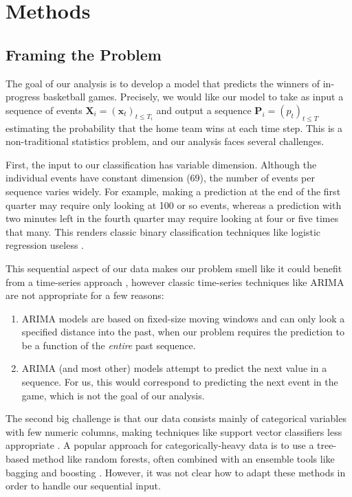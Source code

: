 \section{Methods}
\label{sec:methods}

\subsection{Framing the Problem}

The goal of our analysis is to develop a model that predicts the winners of in-progress basketball games. Precisely, we would like our model to take as input a sequence of events $\mathbf X_i = (\mathbf x_t)_{t \leq T_i}$ and output a sequence $\mathbf P_i = (p_t)_{t \leq T}$ estimating the probability that the home team wins at each time step. This is a non-traditional statistics problem, and our analysis faces several challenges.

First, the input to our classification has variable dimension. Although the individual events have constant dimension (69), the number of events per sequence varies widely. For example, making a prediction at the end of the first quarter may require only looking at 100 or so events, whereas a prediction with two minutes left in the fourth quarter may require looking at four or five times that many. This renders classic binary classification techniques like logistic regression useless \cite[\S 4.4]{ESL}.

This sequential aspect of our data makes our problem smell like it could benefit from a time-series approach \cite[ch. 4, 5]{TSA}, however classic time-series techniques like ARIMA are not appropriate for a few reasons:
\begin{enumerate}
	\item ARIMA models are based on fixed-size moving windows and can only look a specified distance into the past, when our problem requires the prediction to be a function of the \emph{entire} past sequence.
	\item ARIMA (and most other) models attempt to predict the next value in a sequence. For us, this would correspond to predicting the next event in the game, which is not the goal of our analysis.
\end{enumerate}

The second big challenge is that our data consists mainly of categorical variables with few numeric columns, making techniques like support vector classifiers less appropriate \cite[\S 9]{ISL}. A popular approach for categorically-heavy data is to use a tree-based method like random forests, often combined with an ensemble tools like bagging and boosting \cite[\S 9, \S 10]{ESL}. However, it was not clear how to adapt these methods in order to handle our sequential input.

